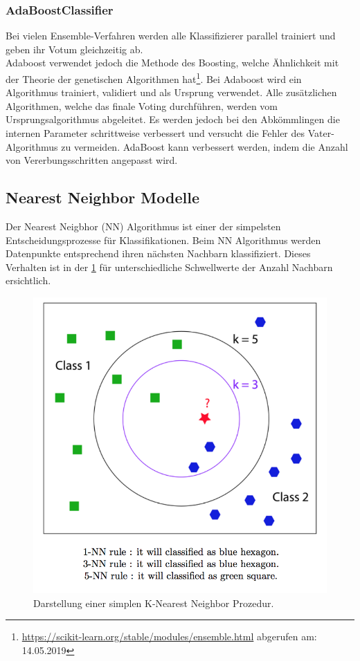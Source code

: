 \subsubsection{AdaBoostClassifier}
Bei vielen Ensemble-Verfahren werden alle Klassifizierer parallel trainiert und geben ihr Votum gleichzeitig ab.\\
Adaboost verwendet jedoch die Methode des \glqq Boosting\grqq{}, welche Ähnlichkeit mit der Theorie der genetischen Algorithmen hat\footnote{\url{https://scikit-learn.org/stable/modules/ensemble.html} abgerufen am: 14.05.2019}.
Bei Adaboost wird ein Algorithmus trainiert, validiert und als Ursprung verwendet. Alle zusätzlichen Algorithmen, welche das finale Voting durchführen, werden vom Ursprungsalgorithmus abgeleitet.
Es werden jedoch bei den Abkömmlingen die internen Parameter schrittweise verbessert und versucht die Fehler des \glqq Vater-Algorithmus\grqq{} zu vermeiden.
AdaBoost kann verbessert werden, indem die Anzahl von Vererbungsschritten angepasst wird\cite{freund1999short}.
\subsection{Nearest Neighbor Modelle}
Der Nearest Neigbhor (NN) Algorithmus ist einer der simpelsten Entscheidungsprozesse für Klassifikationen.
Beim NN Algorithmus werden Datenpunkte entsprechend ihren nächsten Nachbarn klassifiziert\cite{cover1967nearest}.
Dieses Verhalten ist in der \cref{fig:knn} für unterschiedliche Schwellwerte der Anzahl Nachbarn ersichtlich.
\begin{figure}[H]	
	\includegraphics[width=0.7\columnwidth,keepaspectratio]{img/knn.png}
	\caption{Darstellung einer simplen K-Nearest Neighbor Prozedur.}
	\label{fig:knn}
\end{figure}
